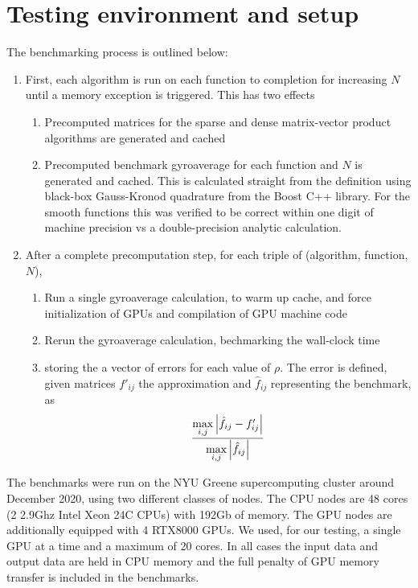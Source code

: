 \section{Testing environment and setup\label{sec:Environment}}
The benchmarking process is outlined below:
\begin{enumerate}
	\item First, each algorithm is run on each function to completion for increasing $N$ until a memory exception is triggered.  This has two effects
	\begin{enumerate}
		\item Precomputed matrices for the sparse and dense matrix-vector product algorithms are generated and cached
		\item Precomputed benchmark gyroaverage for each function and $N$ is generated and cached.  This is calculated straight from the definition using black-box Gauss-Kronod quadrature from the Boost C++ library.  For the smooth functions this was verified to be correct within one digit of machine precision vs a double-precision analytic calculation.  
	\end{enumerate}
	\item After a complete precomputation step, for each triple of (algorithm, function, $N$),
	\begin{enumerate}
		\item Run a single gyroaverage calculation, to warm up cache, and force initialization of GPUs and compilation of GPU machine code
		\item Rerun the gyroaverage calculation, bechmarking the wall-clock time
		\item storing the a vector of errors for each value of $\rho$.  The error is defined, given matrices $f'_{ij}$ the approximation and $\hat{f}_{ij}$ representing the benchmark, as
		\[  \frac{\max\limits_{i,j} \abs{\hat{f}_{ij} - f'_{ij} } }{\max\limits_{i,j} \abs{\hat{f}_{ij}} } \] 
	\end{enumerate}
\end{enumerate}  

	The benchmarks were run on the NYU Greene supercomputing cluster around December 2020, using two different classes of nodes.  The CPU nodes are 48 cores (2 2.9Ghz Intel Xeon 24C CPUs) with 192Gb of memory.  The GPU nodes are additionally equipped with 4 RTX8000 GPUs.  We used, for our testing, a single GPU at a time and a maximum of 20 cores.  In all cases the input data and output data are held in CPU memory and the full penalty of GPU memory transfer is included in the benchmarks.  
	

